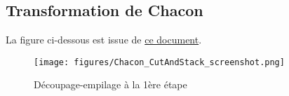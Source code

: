 \documentclass[12pt,a4paper]{article}
\begin{document}
\newpage 
\begin{appendices}

\section{Transformation de Chacon}\label{app:transfoChacon}

La figure ci-dessous est issue de \href{https://cdr.lib.unc.edu/indexablecontent/uuid:bfc41b0c-b048-440f-9a57-533e02ea4f76}{ce document}.  

\begin{figure}[!h]
\texttt{[image: figures/Chacon\_CutAndStack\_screenshot.png]} 
\caption{Découpage-empilage à la 1ère étape}
\end{figure}


\end{appendices}
\end{document}
